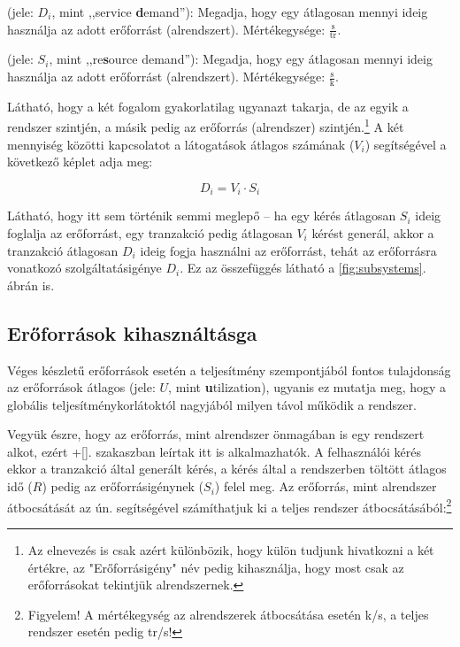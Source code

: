 \begin{definicio}
	 (jele: $D_i$, mint ,,service \textbf{d}emand''): Megadja, hogy egy  átlagosan mennyi ideig használja az adott erőforrást (alrendszert). Mértékegysége: $\frac{\mathrm{s}}{\mathrm{tr}}$.
\end{definicio}

\begin{definicio}
	 (jele: $S_i$, mint ,,re\textbf{s}ource demand''): Megadja, hogy egy  átlagosan mennyi ideig használja az adott erőforrást (alrendszert). Mértékegysége: $\frac{\mathrm{s}}{\mathrm{k}}$.
\end{definicio}

Látható, hogy a két fogalom gyakorlatilag ugyanazt takarja, de az egyik a rendszer szintjén, a másik pedig az erőforrás (alrendszer) szintjén.\footnote{Az elnevezés is csak azért különbözik, hogy külön tudjunk hivatkozni a két értékre, az "Erőforrásigény" név pedig kihasználja, hogy most csak az erőforrásokat tekintjük alrendszernek.} A két mennyiség közötti kapcsolatot a látogatások átlagos számának ($V_i$) segítségével a következő képlet adja meg:

$$D_i = V_i \cdot S_i$$

Látható, hogy itt sem történik semmi meglepő -- ha egy kérés átlagosan $S_i$ ideig foglalja az erőforrást, egy tranzakció pedig átlagosan $V_i$ kérést generál, akkor a tranzakció átlagosan $D_i$ ideig fogja használni az erőforrást, tehát az erőforrásra vonatkozó szolgáltatásigénye $D_i$. Ez az összefüggés látható a \ref{fig:subsystems}. ábrán is.

\subsection{Erőforrások kihasználtásga}

Véges készletű erőforrások esetén a teljesítmény szempontjából fontos tulajdonság az erőforrások átlagos  (jele: $U$, mint \textbf{u}tilization), ugyanis ez mutatja meg, hogy a globális teljesítménykorlátoktól nagyjából milyen távol működik a rendszer.

Vegyük észre, hogy az erőforrás, mint alrendszer önmagában is egy rendszert alkot, ezért \az+\autoref{}. szakaszban leírtak itt is alkalmazhatók. A felhasználói kérés ekkor a tranzakció által generált kérés, a kérés által a rendszerben töltött átlagos idő ($R$) pedig az erőforrásigénynek ($S_i$) felel meg. Az erőforrás, mint alrendszer átbocsátását az ún.  segítségével számíthatjuk ki a teljes rendszer átbocsátásából:\footnote{Figyelem! A mértékegység az alrendszerek átbocsátása esetén k/s, a teljes rendszer esetén pedig tr/s!}

